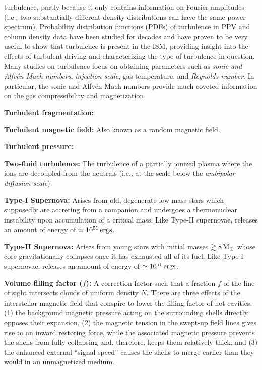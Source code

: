 \documentclass[a4paper,11pt]{article}
\begin{document}
turbulence, partly because it only contains information on Fourier amplitudes (i.e., two substantially different density distributions can have the same power spectrum). Probability distribution functions (PDFs) of turbulence in PPV and column density data have been studied for decades and have proven to be very useful to show that turbulence is present in the ISM, providing insight into the effects of turbulent driving and characterizing the type of turbulence in question. Many studies on turbulence focus on obtaining parameters such as \textit{sonic and Alfv\'en Mach numbers}, \textit{injection scale}, gas temperature, and \textit{Reynolds number}. In particular, the sonic and Alfv\'en Mach numbers provide much coveted information on the gas compressibility and magnetization.

{\noindent}\textbf{Turbulent fragmentation:}

{\noindent}\textbf{Turbulent magnetic field:} Also known as a random magnetic field.

{\noindent}\textbf{Turbulent pressure:}

{\noindent}\textbf{Two-fluid turbulence:} The turbulence of a partially ionized plasma where the ions are decoupled from the neutrals (i.e., at the scale below the \textit{ambipolar diffusion scale}).

{\noindent}\textbf{Type-I Supernova:} Arises from old, degenerate low-mass stars which supposedly are accreting from a companion and undergoes a thermonuclear instability upon accumulation of a critical mass. Like Type-II supernovae, releases an amount of energy of $\simeq10^{51}\,{\rm ergs}$.

{\noindent}\textbf{Type-II Supernova:} Arises from young stars with initial masses $\gtrsim8\,{\rm M}_\odot$ whose core gravitationally collapses once it has exhausted all of its fuel. Like Type-I supernovae, releases an amount of energy of $\simeq10^{51}\,{\rm ergs}$.

{\noindent}\textbf{Volume filling factor ($f$):} A correction factor such that a fraction $f$ of the line of sight intersects clouds of uniform density $N$. There are three effects of the interstellar magnetic field that conspire to lower the filling factor of hot cavities: (1) the background magnetic pressure acting on the surrounding shells directly opposes their expansion, (2) the magnetic tension in the swept-up field lines gives rise to an inward restoring force, while the associated magnetic pressure prevents the shells from fully collapsing and, therefore, keeps them relatively thick, and (3) the enhanced external ``signal speed'' causes the shells to merge earlier than they would in an unmagnetized medium.
\end{document}
